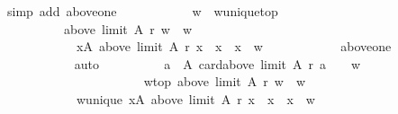 \begin{isabellebody}
\ {\isacharparenleft}{\kern0pt}simp\ add{\isacharcolon}{\kern0pt}\ above{\isacharunderscore}{\kern0pt}one{\isacharparenright}{\kern0pt}\isanewline
\ \ \ \ \ \ \ \ \isamarkupfalse%
\ \isamarkupfalse%
\ w\ \ w{\isacharunderscore}{\kern0pt}unique{\isacharunderscore}{\kern0pt}top{\isacharcolon}{\kern0pt}\isanewline
\ \ \ \ \ \ \ \ \ \ {\isachardoublequoteopen}above\ {\isacharparenleft}{\kern0pt}limit\ A\ r{\isacharparenright}{\kern0pt}\ w\ {\isacharequal}{\kern0pt}\ {\isacharbraceleft}{\kern0pt}w{\isacharbraceright}{\kern0pt}\ {\isasymand}\isanewline
\ \ \ \ \ \ \ \ \ \ \ \ {\isacharparenleft}{\kern0pt}{\isasymforall}x{\isasymin}A{\isachardot}{\kern0pt}\ above\ {\isacharparenleft}{\kern0pt}limit\ A\ r{\isacharparenright}{\kern0pt}\ x\ {\isacharequal}{\kern0pt}\ {\isacharbraceleft}{\kern0pt}x{\isacharbraceright}{\kern0pt}\ {\isasymlongrightarrow}\ x\ {\isacharequal}{\kern0pt}\ w{\isacharparenright}{\kern0pt}{\isachardoublequoteclose}\isanewline
\ \ \ \ \ \ \ \ \ \ \isamarkupfalse%
\ above{\isacharunderscore}{\kern0pt}one\isanewline
\ \ \ \ \ \ \ \ \ \ \isamarkupfalse%
\ auto\isanewline
\ \ \ \ \ \ \ \ \isamarkupfalse%
\ {\isachardoublequoteopen}{\isacharbraceleft}{\kern0pt}a\ {\isasymin}\ A{\isachardot}{\kern0pt}\ card{\isacharparenleft}{\kern0pt}above\ {\isacharparenleft}{\kern0pt}limit\ A\ r{\isacharparenright}{\kern0pt}\ a{\isacharparenright}{\kern0pt}\ {\isasymle}\ {}{\isacharbraceright}{\kern0pt}\ {\isacharequal}{\kern0pt}\ {\isacharbraceleft}{\kern0pt}w{\isacharbraceright}{\kern0pt}{\isachardoublequoteclose}\isanewline
\ \ \ \ \ \ \ \ \isamarkupfalse%
\isanewline
\ \ \ \ \ \ \ \ \ \ \isamarkupfalse%
\isanewline
\ \ \ \ \ \ \ \ \ \ \ \ w{\isacharunderscore}{\kern0pt}top{\isacharcolon}{\kern0pt}\ {\isachardoublequoteopen}above\ {\isacharparenleft}{\kern0pt}limit\ A\ r{\isacharparenright}{\kern0pt}\ w\ {\isacharequal}{\kern0pt}\ {\isacharbraceleft}{\kern0pt}w{\isacharbraceright}{\kern0pt}{\isachardoublequoteclose}\ \isanewline
\ \ \ \ \ \ \ \ \ \ \ \ w{\isacharunderscore}{\kern0pt}unique{\isacharcolon}{\kern0pt}\ {\isachardoublequoteopen}{\isasymforall}x{\isasymin}A{\isachardot}{\kern0pt}\ above\ {\isacharparenleft}{\kern0pt}limit\ A\ r{\isacharparenright}{\kern0pt}\ x\ {\isacharequal}{\kern0pt}\ {\isacharbraceleft}{\kern0pt}x{\isacharbraceright}{\kern0pt}\ {\isasymlongrightarrow}\ x\ {\isacharequal}{\kern0pt}\ w{\isachardoublequoteclose}\isanewline
\ \ \ \ \ \ \ \ \ \ \isamarkupfalse%

\end{isabellebody}
